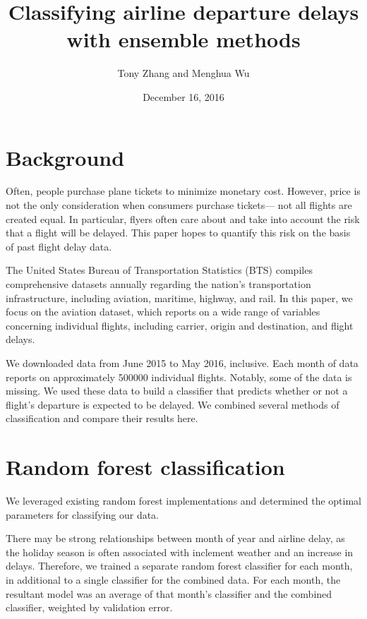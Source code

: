 \documentclass{article}
\title{Classifying airline departure delays with ensemble methods}
\author{Tony Zhang and Menghua Wu}
\date{December 16, 2016}
\begin{document}
\maketitle

\begin{multicols}{2}


\section{Background}
\label{sec:bg}

Often, people purchase plane tickets
to minimize monetary cost.
However, price is not the only consideration
when consumers purchase tickets---
not all flights are created equal.
In particular,
flyers often care about and take into account
the risk that a flight will be delayed.
This paper hopes to quantify this risk
on the basis of past flight delay data.

The United States Bureau of Transportation Statistics (BTS)
compiles comprehensive datasets annually
regarding the nation's transportation infrastructure,
including aviation, maritime, highway, and rail.
In this paper, we focus on the aviation dataset,
which reports on a wide range of variables concerning individual flights,
including carrier, origin and destination, and flight delays.

We downloaded data from June 2015 to May 2016, inclusive.
Each month of data reports on
approximately 500000 individual flights.
Notably, some of the data is missing.
We used these data to build a classifier
that predicts whether or not a flight's departure
is expected to be delayed.
We combined several methods of classification
and compare their results here.

\section{Random forest classification}

We leveraged existing random forest implementations
and determined the optimal parameters for classifying our data.

There may be strong relationships between
month of year and airline delay,
as the holiday season is often associated with
inclement weather and an increase in delays.
Therefore, we trained a separate random forest classifier
for each month, in additional to a single classifier
for the combined data.
For each month,
the resultant model was an average of
that month's classifier and the combined classifier,
weighted by validation error.


\end{multicols}
\end{document}
